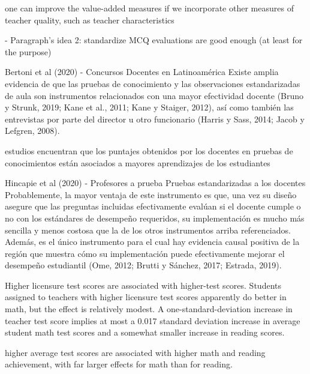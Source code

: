 one can improve the value-added measures if we incorporate other measures of teacher quality, such as teacher characteristics \citep{Chetty_et_al_2014a}



- Paragraph's idea 2: standardize MCQ evaluations are good enough (at least for the purpose)

Bertoni et al (2020) - Concursos Docentes en Latinoamérica
Existe amplia evidencia de que las pruebas de conocimiento y las observaciones estandarizadas de aula son instrumentos relacionados con una mayor efectividad docente (Bruno y Strunk, 2019; Kane et al., 2011; Kane y Staiger, 2012), así como también las entrevistas por parte del director u otro funcionario (Harris y Sass, 2014; Jacob y Lefgren, 2008).

estudios encuentran que los puntajes obtenidos por los docentes en pruebas de conocimientos están asociados a mayores aprendizajes de los estudiantes \citep{Bietenbeck_et_al_2018, Clotfelter_et_al_2006, Clotfelter_et_al_2007}


Hincapie et al (2020) - Profesores a prueba
Pruebas estandarizadas a los docentes
Probablemente, la mayor ventaja de este instrumento es que, una vez su diseño asegure que las preguntas incluidas efectivamente evalúan si el docente cumple o no con los estándares de desempeño requeridos, su implementación es mucho más sencilla y menos costosa que la de los otros instrumentos arriba referenciados. Además, es el único instrumento para el cual hay evidencia causal positiva de la región que muestra cómo su implementación puede efectivamente mejorar el desempeño estudiantil (Ome, 2012; Brutti y Sánchez, 2017; Estrada, 2019).


Higher licensure test scores are associated with higher-test scores. Students assigned to teachers with higher licensure test scores apparently do better in math, but the effect is relatively modest. A one-standard-deviation increase in teacher test score implies at most a 0.017 standard deviation increase in average student math test scores and a somewhat smaller increase in reading scores. \citep{Clotfelter_et_al_2006}

higher average test scores are associated with higher math and reading achievement, with far larger effects for math than for reading. \citep{Clotfelter_et_al_2007}


